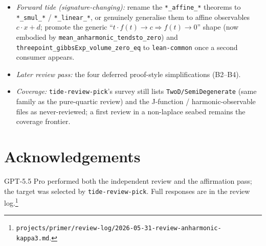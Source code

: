 \documentclass[11pt]{article}
\begin{document}
\begin{itemize}
\item \emph{Forward tide (signature-changing):} rename the \texttt{*\_affine\_*}
  theorems to \texttt{*\_smul\_*} / \texttt{*\_linear\_*}, or genuinely generalise
  them to affine observables $c\cdot x+d$; promote the generic
  ``$t\cdot f(t)\to c\Rightarrow f(t)\to0$'' shape (now embodied by
  \texttt{mean\_anharmonic\_tendsto\_zero}) and
  \texttt{threepoint\_gibbsExp\_volume\_zero\_eq} to \texttt{lean-common} once a
  second consumer appears.
\item \emph{Later review pass:} the four deferred proof-style simplifications (B2--B4).
\item \emph{Coverage:} \texttt{tide-review-pick}'s survey still lists
  \texttt{TwoD/SemiDegenerate} (same family as the pure-quartic review) and the
  J-function / harmonic-observable files as never-reviewed; a first review in a
  non-laplace seabed remains the coverage frontier.
\end{itemize}

\section*{Acknowledgements}

GPT-5.5 Pro performed both the independent review and the affirmation pass; the
target was selected by \texttt{tide-review-pick}. Full responses are in the review
log.\footnote{\texttt{projects/primer/review-log/2026-05-31-review-anharmonic-kappa3.md}.}
\end{document}
